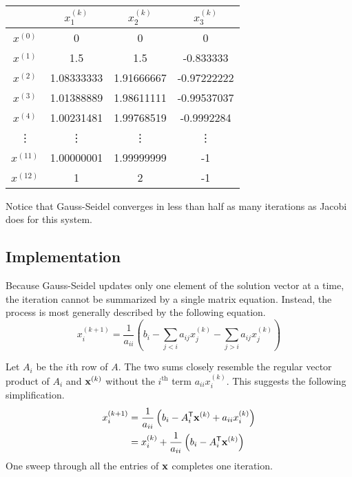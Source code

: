 \begin{center}
\begin{tabular}{c|ccc}
    & $x^{(k)}_1$ & $x^{(k)}_2$ & $x^{(k)}_3$ \\
    \hline
      $x^{(0)}$ & 0 & 0 & 0 \\
      $x^{(1)}$ & 1.5 & 1.5 & -0.833333 \\
      $x^{(2)}$ & 1.08333333 & 1.91666667 & -0.97222222 \\
      $x^{(3)}$ & 1.01388889 & 1.98611111 & -0.99537037 \\
      $x^{(4)}$ & 1.00231481 & 1.99768519 & -0.9992284 \\
      \vdots    & \vdots    & \vdots     & \vdots     \\
      $x^{(11)}$ & 1.00000001 & 1.99999999 & -1 \\
      $x^{(12)}$ & 1 & 2 & -1 \\
\end{tabular}
\end{center}
Notice that Gauss-Seidel converges in less than half as many iterations as Jacobi does for this system.

\subsection*{Implementation} %


Because Gauss-Seidel updates only one element of the solution vector at a time, the iteration cannot be summarized by a single matrix equation.
Instead, the process is most generally described by the following equation.
\begin{equation} \label{eq:gauss-seidel-full}
x^{(k+1)}_i = \frac{1}{a_{ii}} \left (b_i - \sum_{j < i}a_{ij}x^{(k)}_j - \sum_{j > i}a_{ij}x^{(k)}_j \right )
\end{equation}

Let $A_i$ be the $i$th row of $A$.
The two sums closely resemble the regular vector product of $A_i$ and $\mathbf{x}^{(k)}$ without the $i^{\text{th}}$ term $a_{ii}x^{(k)}_i$.
This suggests the following simplification.
\begin{align}
\nonumber x^{(k+1)}_i &= \frac{1}{a_{ii}} \left(b_i - A_i^{\mathsf T}\mathbf{x}^{(k)} + a_{ii}x^{(k)}_i \right)\\
&= x^{(k)}_i + \frac{1}{a_{ii}}\left( b_i - A_i^{\mathsf T}\mathbf{x}^{(k)}\right)
\label{eq:gauss_seidel}
\end{align}
One sweep through all the entries of $\mathbf{x}$ completes one iteration.

